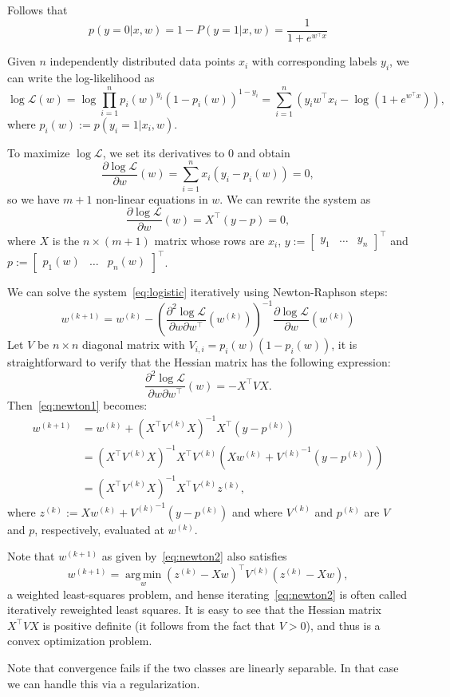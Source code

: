 \documentclass[notitlepage]{report}
\DeclareMathOperator*{\argmin}{arg\,min}
\begin{document}
Follows that
$$
p(y=0|x,w) = 1-P(y=1|x,w) = \frac{1}{1+e^{w^\top x}}
$$

Given $n$ independently distributed data points $x_i$ with corresponding labels $y_i$, we can write the log-likelihood as
$$
\log \mathcal{L}(w) = \log \prod_{i=1}^n p_i(w)^{y_i}  (1-p_i(w))^{1-y_i} = \sum_{i=1}^n \left(y_i w^\top x_i - \log\left(1+e^{w^\top x}\right)\right),
$$
where $p_i(w):=p(y_i=1|x_i, w)$.

To maximize $\log\mathcal L$, we set its derivatives to 0 and obtain
$$
\frac{\partial\log\mathcal L}{\partial w}(w) = \sum_{i=1}^n x_i(y_i-p_i(w)) = 0,
$$
so we have $m+1$ non-linear equations in $w$. 
We can rewrite the system as
\begin{equation}
\frac{\partial\log\mathcal L}{\partial w}(w) = X^\top (y-p) = 0,
\label{eq:logistic}
\end{equation}
where $X$ is the $n\times (m+1)$ matrix whose rows are $x_i$, $y:=\begin{bmatrix}y_1 & \dots & y_n\end{bmatrix}^\top$ and $p:=\begin{bmatrix}p_1(w) & \dots & p_n(w)\end{bmatrix}^\top$.

We can solve the system~\eqref{eq:logistic} iteratively using Newton-Raphson steps:
\begin{equation}
w^{(k+1)} = w^{(k)} - \left(\frac{\partial^2 \log \mathcal L}{\partial w \partial w^\top}\left(w^{(k)}\right)\right)^{-1}\frac{\partial \log \mathcal L}{\partial w}\left(w^{(k)}\right)
\label{eq:newton1}
\end{equation}
Let $V$ be $n\times n$ diagonal matrix with $V_{i,i} = p_i(w)(1-p_i(w))$, it is straightforward to verify that the Hessian matrix has the following expression:
$$
\frac{\partial^2 \log \mathcal L}{\partial w \partial w^\top}\left(w\right) = -X^\top V X.
$$
Then~\eqref{eq:newton1} becomes:
\begin{equation}
\label{eq:newton2}
\begin{split}
w^{(k+1)} &= w^{(k)} + \left(X^\top V^{(k)} X\right)^{-1} X^\top (y - p^{(k)}) \\
          &= \left(X^\top V^{(k)} X\right)^{-1} X^\top V^{(k)} \left(X w^{(k)} + {V^{(k)}}^{-1} (y - p^{(k)})\right) \\
          &= \left(X^\top V^{(k)} X\right)^{-1} X^\top V^{(k)} z^{(k)},
\end{split}
\end{equation}
where $z^{(k)}:=Xw^{(k)} + {V^{(k)}}^{-1} (y - p^{(k)})$ and where $V^{(k)}$ and $p^{(k)}$ are $V$ and $p$, respectively, evaluated at $w^{(k)}$.

Note that $w^{(k+1)}$ as given by~\eqref{eq:newton2} also satisfies
$$
w^{(k+1)} = \argmin\limits_w \left(z^{(k)}-Xw\right)^\top V^{(k)} \left(z^{(k)}-Xw\right),
$$
a weighted least-squares problem, and hense iterating~\eqref{eq:newton2} is often called iteratively reweighted least squares.
It is easy to see that the Hessian matrix $X^\top V X$ is positive definite (it follows from the fact that $V>0$), and thus is a convex optimization problem.

Note that convergence fails if the two classes are linearly separable. In that case we can handle this via a regularization.
\end{document}
